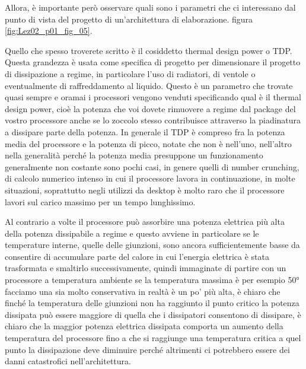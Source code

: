 Allora, è importante però osservare quali sono i parametri che ci interessano dal punto di vista del progetto di un'architettura di elaborazione. figura \ref{fig:Lez02_p01_fig_05}.

Quello che spesso troverete scritto è il cosiddetto thermal design power o TDP.
Questa grandezza è usata come specifica di progetto per dimensionare il progetto di dissipazione a regime, in particolare l'uso di radiatori, di ventole o eventualmente di raffreddamento al liquido.
Questo è un parametro che trovate quasi sempre e oramai i processori vengono venduti specificando qual è il thermal design power, cioè la potenza che voi dovete rimuovere a regime dal package del vostro processore anche se lo zoccolo stesso contribuisce attraverso la piadinatura a dissipare parte della potenza.
In generale il TDP è compreso fra la potenza media del processore e la potenza di picco, notate che non è nell'uno, nell'altro nella generalità perché la potenza media presuppone un funzionamento generalmente non costante sono pochi casi, in genere quelli di number crunching, di calcolo numerico intenso in cui il processore lavora in continuazione, in molte situazioni, soprattutto negli utilizzi da desktop è molto raro che il processore lavori sul carico massimo per un tempo lunghissimo.

Al contrario a volte il processore può assorbire una potenza elettrica più alta della potenza dissipabile a regime e questo avviene in particolare se le temperature interne, quelle delle giunzioni, sono ancora sufficientemente basse da consentire di accumulare parte del calore in cui l'energia elettrica è stata trasformata e smaltirlo successivamente, quindi immaginate di partire con un processore a temperatura ambiente se la temperatura massima è per esempio 50° facciamo una sia molto conservativa in realtà è un po' più alta, è chiaro che finché la temperatura delle giunzioni non ha raggiunto il punto critico la potenza dissipata può essere maggiore di quella che i dissipatori consentono di dissipare, è chiaro che la maggior potenza elettrica dissipata comporta un aumento della temperatura del processore fino a che si raggiunge una temperatura critica a quel punto la dissipazione deve diminuire perché altrimenti ci potrebbero essere dei danni catastrofici nell'architettura.

